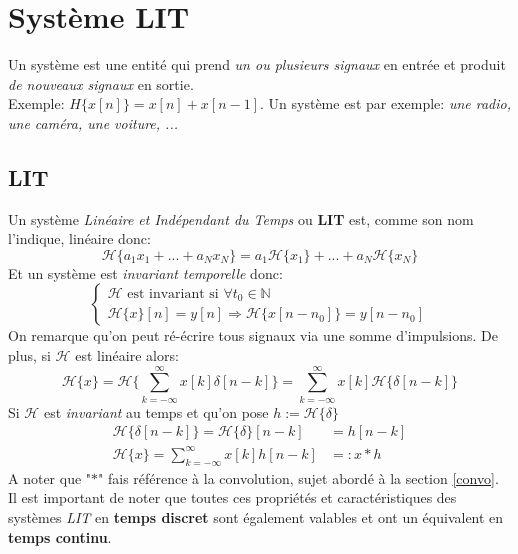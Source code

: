 \documentclass{report}
\begin{document}
\chapter{Système LIT}
Un système est une entité qui prend \textit{un ou plusieurs signaux} en entrée et produit \textit{de nouveaux signaux} en sortie.\\
Exemple: $H\{x[n]\} = x[n] + x[n-1]$. Un système est par exemple: \textit{une radio, une caméra, une voiture, ...}

\section{LIT}
Un système \textit{Linéaire et Indépendant du Temps} ou \textbf{LIT} est, comme son nom l'indique, linéaire donc:
\begin{equation}
\mathcal{H}\{a_1x_1 + ... + a_Nx_N\} = a_1\mathcal{H}\{x_1\} + ... + a_N\mathcal{H}\{x_N\} 
\end{equation}
Et un système est \textit{invariant temporelle} donc:
\begin{equation}
\begin{cases}
\mathcal{H} \text{ est invariant si } \forall t_0 \in \mathbb{N}\\
\mathcal{H}\{x\}[n] = y[n] \Rightarrow \mathcal{H}\{x[n-n_0]\} = y[n-n_0]
\end{cases}
\end{equation}
On remarque qu'on peut ré-écrire tous signaux via une somme d'impulsions. De plus, si $\mathcal{H}$ est linéaire alors:
\begin{equation}
\mathcal{H}\{x\} = \mathcal{H}\biggl\{\sum_{k= -\infty}^{\infty} x[k]\delta[n-k] \biggl\} = \sum_{k=-\infty}^{\infty} x[k]\mathcal{H}\{\delta[n-k]\}
\end{equation}
Si $\mathcal{H}$ est \textit{invariant} au temps et qu'on pose $h := \mathcal{H}\{\delta\}$
\begin{align*}
\mathcal{H}\{\delta[n-k]\} = \mathcal{H}\{\delta\}[n-k] &= h[n-k]\\
\mathcal{H}\{x\} = \sum_{k=-\infty}^{\infty} x[k]h[n-k] &=: x \ast h
\end{align*}
A noter que "$\ast$" fais référence à la convolution, sujet abordé à la section \ref{convo}.\\

Il est important de noter que toutes ces propriétés et caractéristiques des systèmes \textit{LIT} en \textbf{temps discret} sont également valables et ont un équivalent en \textbf{temps continu}.
\end{document}
